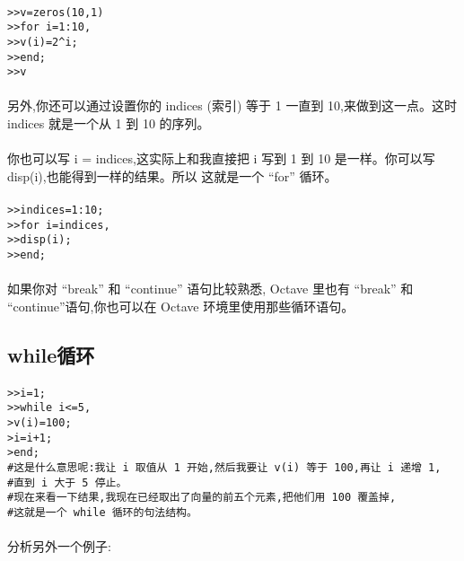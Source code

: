 \documentclass{article}
\begin{document}
\begin{CJK}{UTF8}{gbsn}
\paragraph{}
\begin{verbatim}
>>v=zeros(10,1)
>>for i=1:10,
>>v(i)=2^i;
>>end;
>>v
\end{verbatim}
\paragraph{}
另外,你还可以通过设置你的 indices (索引) 等于 1 一直到 10,来做到这一点。这时indices 就是一个从 1 到 10 的序列。
\paragraph{}
你也可以写 i = indices,这实际上和我直接把 i 写到 1 到 10 是一样。你可以写 disp(i),也能得到一样的结果。所以 这就是一个 “for” 循环。
\paragraph{}
\begin{verbatim}
>>indices=1:10;
>>for i=indices,
>>disp(i);
>>end;
\end{verbatim}
\paragraph{}
如果你对 “break” 和 “continue” 语句比较熟悉, Octave 里也有 “break” 和 “continue”语句,你也可以在 Octave 环境里使用那些循环语句。
\subsection{while循环}
\paragraph{}
\begin{verbatim}
>>i=1;
>>while i<=5,
>v(i)=100;
>i=i+1;
>end;
#这是什么意思呢:我让 i 取值从 1 开始,然后我要让 v(i) 等于 100,再让 i 递增 1,
#直到 i 大于 5 停止。
#现在来看一下结果,我现在已经取出了向量的前五个元素,把他们用 100 覆盖掉,
#这就是一个 while 循环的句法结构。
\end{verbatim}
\paragraph{}
分析另外一个例子:

\end{CJK}
\end{document}
